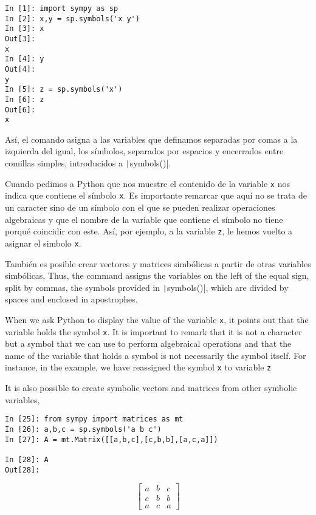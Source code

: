 \begin{center}
	\begin{minipage}{.3\textwidth}
		\begin{verbatim}
In [1]: import sympy as sp
In [2]: x,y = sp.symbols('x y')
In [3]: x
Out[3]: 
x
In [4]: y
Out[4]: 
y
In [5]: z = sp.symbols('x')
In [6]: z
Out[6]: 
x				
		\end{verbatim}
	\end{minipage}
\end{center}
\begin{paracol}{2}
Así, el comando asigna a las variables que definamos separadas por comas a la izquierda del igual, los símbolos, separados por espacios y encerrados entre comillas simples, introducidos a \texttt|symbols()|.

Cuando pedimos a Python que nos muestre el contenido de la variable \texttt{x} nos indica que contiene el símbolo \texttt{x}. Es importante remarcar que aquí no se trata de un caracter sino de un símbolo con el que se pueden realizar operaciones algebraicas y que el nombre de la variable que contiene el símbolo no tiene porqué coincidir con este. Así, por ejemplo, a la variable \texttt{z}, le hemos vuelto a asignar el simbolo \texttt{x}.

También es posible crear vectores y matrices simbólicas a partir de otras variables simbólicas,
\switchcolumn
Thus, the command assigns the variables on the left of the equal sign, split by commas, the symbols provided in \texttt|symbols()|, which are divided by spaces and enclosed in apostrophes.

When we ask Python to display the value of the variable \texttt{x}, it points out that the variable holds the symbol \texttt{x}. It is important to remark that it is not a character but a symbol that we can use to perform algebraical operations and that the name of the variable that holds a symbol is not necessarily the symbol itself. For instance, in the example, we have reassigned the symbol \texttt{x} to variable \texttt{z}

It is also possible to create symbolic vectors and matrices from other symbolic variables,

\end{paracol}
\begin{center}
	\begin{minipage}{.5\textwidth}
		\begin{verbatim}
In [25]: from sympy import matrices as mt
In [26]: a,b,c = sp.symbols('a b c')
In [27]: A = mt.Matrix([[a,b,c],[c,b,b],[a,c,a]])
			
In [28]: A
Out[28]: 				
		\end{verbatim}
\[
\begin{bmatrix}
a&b&c\\
c&b&b\\
a&c&a
\end{bmatrix}
\]
	\end{minipage}
\end{center}
